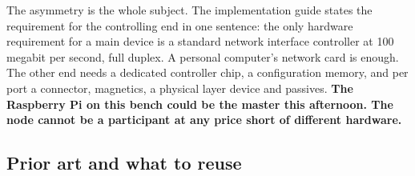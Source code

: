 The asymmetry is the whole subject. The implementation guide states the
requirement for the controlling end in one sentence: the only hardware
requirement for a main device is a standard network interface controller at 100
megabit per second, full duplex. A personal computer's network card is enough.
The other end needs a dedicated controller chip, a configuration memory, and per
port a connector, magnetics, a physical layer device and passives. \textbf{The
Raspberry Pi on this bench could be the master this afternoon. The node cannot
be a participant at any price short of different hardware.}

\subsection*{Prior art and what to reuse}

